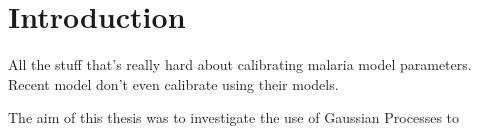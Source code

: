 \chapter{Introduction}

All the stuff that's really hard about calibrating malaria model parameters.
Recent model don't even calibrate using their models.

The aim of this thesis was to investigate the use of Gaussian Processes to
